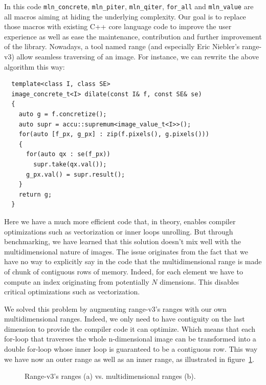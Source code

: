 In this code \texttt{mln\_concrete}, \texttt{mln\_piter}, \texttt{mln\_qiter}, \texttt{for\_all} and \texttt{mln\_value}
are all macros aiming at hiding the underlying complexity. Our goal is to replace those macros with existing C++ core
language code to improve the user experience as well as ease the maintenance, contribution and further improvement of
the library. Nowadays, a tool named range (and especially Eric Niebler's range-v3) allow seamless traversing of an
image. For instance, we can rewrite the above algorithm this way:

\begin{verbatim}
  template<class I, class SE>
  image_concrete_t<I> dilate(const I& f, const SE& se)
  {
    auto g = f.concretize();
    auto supr = accu::supremum<image_value_t<I>>();
    for(auto [f_px, g_px] : zip(f.pixels(), g.pixels()))
    {
      for(auto qx : se(f_px))
        supr.take(qx.val());
      g_px.val() = supr.result();
    }
    return g;
  }
\end{verbatim}

Here we have a much more efficient code that, in theory, enables compiler optimizations such as vectorization or inner
loops unrolling. But through benchmarking, we have learned that this solution doesn't mix well with the multidimensional
nature of images. The issue originates from the fact that we have no way to explicitly say in the code that the
multidimensional range is made of chunk of contiguous rows of memory. Indeed, for each element we have to compute an
index originating from potentially $N$ dimensions. This disables critical optimizations such as vectorization.

We solved this problem by augmenting range-v3's ranges with our own multidimensional ranges. Indeed, we only need to
have contiguity on the last dimension to provide the compiler code it can optimize. Which means that each for-loop that
traverses the whole n-dimensional image can be transformed into a double for-loop whose inner loop is guaranteed to be a
contiguous row. This way we have now an outer range as well as an inner range, as illustrated in
figure~\ref{fig.inner.outer.range}.

\begin{figure}[htbp]
  \centering
  \caption{Range-v3's ranges (a) vs. multidimensional ranges (b).}
  \label{fig.inner.outer.range}
\end{figure}

